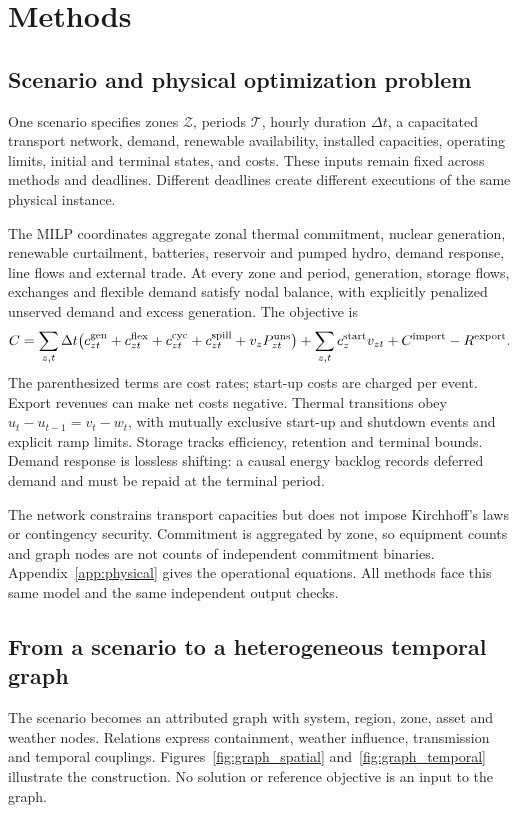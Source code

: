 \section{Methods}
\subsection{Scenario and physical optimization problem}
One scenario specifies zones $\mathcal Z$, periods $\mathcal T$, hourly duration
$\Delta t$, a capacitated transport network, demand, renewable availability,
installed capacities, operating limits, initial and terminal states, and costs.
These inputs remain fixed across methods and deadlines. Different deadlines
create different executions of the same physical instance.

The MILP coordinates aggregate zonal thermal commitment, nuclear generation,
renewable curtailment, batteries, reservoir and pumped hydro, demand response,
line flows and external trade. At every zone and period, generation, storage
flows, exchanges and flexible demand satisfy nodal balance, with explicitly
penalized unserved demand and excess generation. The objective is
\begin{equation}
 C=\sum_{z,t}\Delta t\bigl(c^{\rm gen}_{zt}+c^{\rm flex}_{zt}
       +c^{\rm cyc}_{zt}+c^{\rm spill}_{zt}+v_zP^{\rm uns}_{zt}\bigr)
       +\sum_{z,t}c_z^{\rm start}v_{zt}
       +C^{\rm import}-R^{\rm export}.
 \label{eq:cost}
\end{equation}
The parenthesized terms are cost rates; start-up costs are charged per event.
Export revenues can make net costs negative. Thermal transitions obey
$u_t-u_{t-1}=v_t-w_t$, with mutually exclusive start-up and shutdown events and
explicit ramp limits. Storage tracks efficiency, retention and terminal
bounds. Demand response is lossless shifting: a causal energy backlog records
deferred demand and must be repaid at the terminal period.

The network constrains transport capacities but does not impose Kirchhoff's
laws or contingency security. Commitment is aggregated by zone, so equipment
counts and graph nodes are not counts of independent commitment binaries.
Appendix~\ref{app:physical} gives the operational equations. All methods face
this same model and the same independent output checks.

\subsection{From a scenario to a heterogeneous temporal graph}
The scenario becomes an attributed graph with system, region, zone, asset
and weather nodes. Relations express containment, weather influence,
transmission and temporal couplings. Figures~\ref{fig:graph_spatial}
and~\ref{fig:graph_temporal} illustrate the construction. No solution or
reference objective is an input to the graph.


